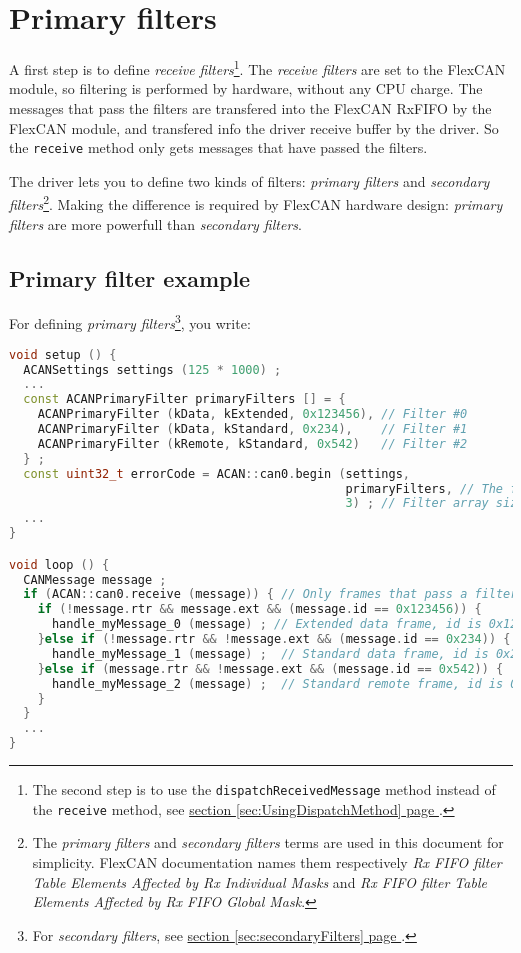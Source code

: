 \documentclass[9pt, a4paper, obeyspaces, openany]{extarticle}
\newcommand \sectionLabel[2]{\section{#1}\label{sec:#2}}
\newcommand\refSectionPage[1]{\hyperref[sec:#1]{section \ref*{sec:#1} page \pageref{sec:#1}}}
\begin{document}
\sectionLabel{Primary filters}{primaryFilters}

A first step is to define \emph{receive filters}\footnote{The second step is to use the \texttt{dispatchReceivedMessage} method instead of the \texttt{receive} method, see \refSectionPage{UsingDispatchMethod}.}. The \emph{receive filters} are set to the FlexCAN module, so filtering is performed by hardware, without any CPU charge. The messages that pass the filters are transfered into the FlexCAN RxFIFO by the FlexCAN module, and transfered info the driver receive buffer by the driver. So the \texttt{receive} method only gets messages that have passed the filters.

The driver lets you to define two kinds of filters: \emph{primary filters} and \emph{secondary filters}\footnote{The \emph{primary filters} and \emph{secondary filters} terms are used in this document for simplicity. FlexCAN documentation names them respectively \emph{Rx FIFO filter Table Elements Affected by Rx Individual Masks} and \emph{Rx FIFO filter Table Elements Affected by Rx FIFO Global Mask}.}. Making the difference is required by FlexCAN hardware design: \emph{primary filters} are more powerfull than \emph{secondary filters}.

\subsection{Primary filter example}

For defining \emph{primary filters}\footnote{For \emph{secondary filters}, see \refSectionPage{secondaryFilters}.}, you write:
{ \small\begin{lstlisting}[language=c++]
void setup () {
  ACANSettings settings (125 * 1000) ;
  ...
  const ACANPrimaryFilter primaryFilters [] = {
    ACANPrimaryFilter (kData, kExtended, 0x123456), // Filter #0
    ACANPrimaryFilter (kData, kStandard, 0x234),    // Filter #1
    ACANPrimaryFilter (kRemote, kStandard, 0x542)   // Filter #2
  } ;
  const uint32_t errorCode = ACAN::can0.begin (settings,
                                               primaryFilters, // The filter array
                                               3) ; // Filter array size
  ...
}

void loop () {
  CANMessage message ;
  if (ACAN::can0.receive (message)) { // Only frames that pass a filter are retrieved
    if (!message.rtr && message.ext && (message.id == 0x123456)) {
      handle_myMessage_0 (message) ; // Extended data frame, id is 0x123456
    }else if (!message.rtr && !message.ext && (message.id == 0x234)) {
      handle_myMessage_1 (message) ;  // Standard data frame, id is 0x234
    }else if (message.rtr && !message.ext && (message.id == 0x542)) {
      handle_myMessage_2 (message) ;  // Standard remote frame, id is 0x542
    }
  }
  ...
}
\end{lstlisting}}
\end{document}
